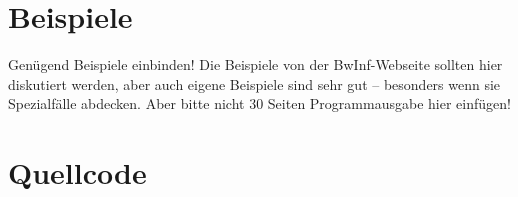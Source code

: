 \documentclass[a4paper,10pt,ngerman]{scrartcl}
\begin{document}
\section{Beispiele}
Genügend Beispiele einbinden! Die Beispiele von der BwInf-Webseite sollten hier
diskutiert werden, aber auch eigene Beispiele sind sehr gut – besonders wenn
sie Spezialfälle abdecken. Aber bitte nicht 30 Seiten Programmausgabe hier
einfügen!

\section{Quellcode}




\begingroup
\def\chapter*#1{}

\endgroup
\end{document}
